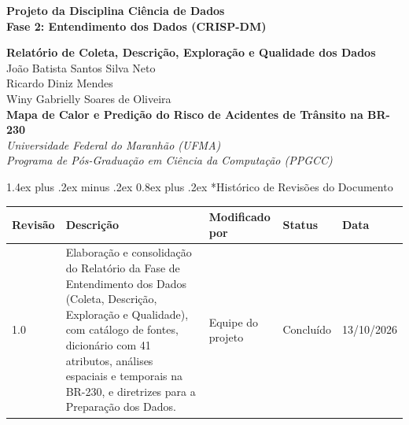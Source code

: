 \documentclass[11pt,a4paper]{article}
\makeatletter
\newcommand{\NomeProjeto}{Mapa de Calor e Predição do Risco de Acidentes de Trânsito na BR-230}
\newcommand{\Componentes}{
João Batista Santos Silva Neto \\
Ricardo Diniz Mendes \\
Winy Gabrielly Soares de Oliveira
}
\renewcommand\section{
\@startsection{section}{1}{0pt}%
{1.4ex plus .2ex minus .2ex}%
{0.8ex plus .2ex}%
{\normalfont\Large\bfseries\color{primary}}
}
\makeatother
\begin{document}
\begin{center}
\vspace*{1.2cm}

{\Large\textbf{Projeto da Disciplina Ciência de Dados}}\\[0.8em]

{\Large\textbf{Fase 2: Entendimento dos Dados (CRISP-DM)}}

\end{center}

\vspace{0.8cm}
\vfill

\begin{center}

{\Huge\textbf{Relatório de Coleta, Descrição, Exploração e Qualidade dos Dados}}\\[1.5cm]

{\Large\Componentes}\\[1.5cm]

{\Large\textbf{\NomeProjeto}}\\[0.5cm]

\textit{Universidade Federal do Maranhão (UFMA) \\ Programa de Pós-Graduação em Ciência da Computação (PPGCC)}

\end{center}

\vfill
\newpage

\section*{Histórico de Revisões do Documento}

\vspace{0.6em}

\begin{center}
\renewcommand{\arraystretch}{1.35}

\begin{tabularx}{\textwidth}{|p{1.6cm}|X|p{3.2cm}|p{2.8cm}|p{2.2cm}|}
\hline
\textbf{Revisão} & \textbf{Descrição} & \textbf{Modificado por} & \textbf{Status} & \textbf{Data} \\
\hline
1.0 & 
Elaboração e consolidação do Relatório da Fase de Entendimento dos Dados (Coleta, Descrição, Exploração e Qualidade), com catálogo de fontes, dicionário com 41 atributos, análises espaciais e temporais na BR-230, e diretrizes para a Preparação dos Dados. & 
Equipe do projeto & 
Concluído & 
13/10/2026 \\
\hline
\end{tabularx}
\end{center}
\end{document}
